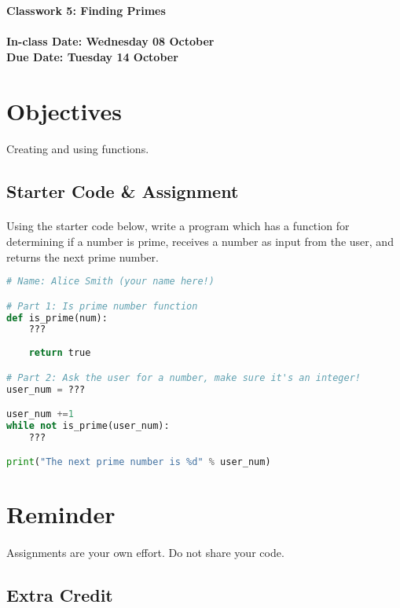 \documentclass[letter,10pt]{article}
\begin{document}
    \huge
    \textbf{Classwork 5: Finding Primes}
    \normalsize
    \\ ~~ \\
    \textbf{In-class Date: Wednesday 08 October} \\
    \textbf{Due Date: Tuesday 14 October}
    
    \section*{Objectives}
    \paragraph{}Creating and using functions.
    
    \subsection*{Starter Code \& Assignment}
    \paragraph{}Using the starter code below, write a program which has a function for determining if a number is prime, receives a number as input from the user, and returns the next prime number.
    
    \begin{lstlisting}[language=python]
# Name: Alice Smith (your name here!)

# Part 1: Is prime number function
def is_prime(num):
    ???
    
    return true

# Part 2: Ask the user for a number, make sure it's an integer!
user_num = ???

user_num +=1
while not is_prime(user_num):
    ???

print("The next prime number is %d" % user_num)
    \end{lstlisting}
    
    \section*{Reminder}
    \paragraph{}Assignments are your own effort. Do not share your code.
    
    \subsection*{Extra Credit}
\end{document}

